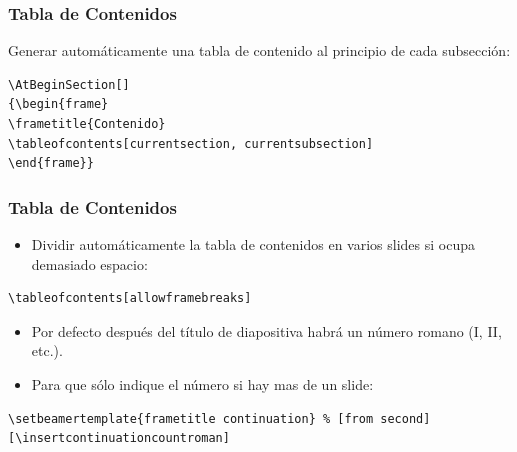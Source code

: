 \documentclass[aspectratio=43]{beamer}%
\begin{document}
\begin{frame}[fragile]
\frametitle{\textbf{Tabla de Contenidos}}
\justifying
 Generar automáticamente una tabla de contenido al principio de cada subsección:
\begin{block}{}
   \lstset{language=}%
   \vspace{-0.7cm}
\begin{lstlisting}
\AtBeginSection[]
{\begin{frame}
\frametitle{Contenido}
\tableofcontents[currentsection, currentsubsection]
\end{frame}}
\end{lstlisting}\vspace{-0.3cm}
\end{block}

\end{frame}

\begin{frame}[fragile]
\frametitle{\textbf{Tabla de Contenidos}}
\justifying
 \begin{itemize}\justifying
  \item Dividir automáticamente la tabla de contenidos en varios slides si ocupa demasiado espacio:
\end{itemize}
\begin{block}{}
   \lstset{language=}%
   \vspace{-0.7cm}
\begin{lstlisting}
\tableofcontents[allowframebreaks]
\end{lstlisting}\vspace{-0.3cm}

\end{block}\begin{itemize}\justifying
  \item Por defecto después del título de diapositiva habrá un número romano (I, II, etc.).
  \item Para que sólo indique el número si hay mas de un slide:
\end{itemize}
\begin{block}{}
   \lstset{language=}%
   \vspace{-0.7cm}
\begin{lstlisting}
\setbeamertemplate{frametitle continuation} % [from second] [\insertcontinuationcountroman]
\end{lstlisting}\vspace{-0.3cm}

\end{block}
\end{frame}
\end{document}
